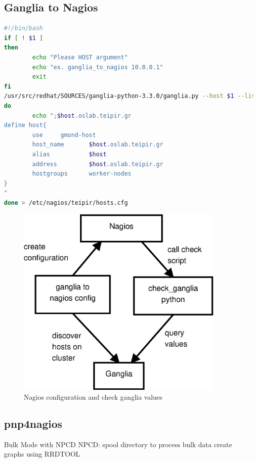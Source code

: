 \subsection{Ganglia to Nagios}

\begin{lstlisting}[language=bash,caption=Ganglia to Nagios script]
#!/bin/bash
if [ ! $1 ]
then
        echo "Please HOST argument"
        echo "ex. ganglia_to_nagios 10.0.0.1"
        exit
fi
/usr/src/redhat/SOURCES/ganglia-python-3.3.0/ganglia.py --host $1 --live | while read host
do
        echo ";$host.oslab.teipir.gr
define host{
        use     gmond-host
        host_name       $host.oslab.teipir.gr
        alias           $host
        address         $host.oslab.teipir.gr
        hostgroups      worker-nodes
}
"
done > /etc/nagios/teipir/hosts.cfg
\end{lstlisting}

\begin{figure}[htb]
\centering
 \includegraphics[width=4in]{images/nagios_check_ganglia.eps}
\caption{Nagios configuration and check ganglia values}
\label{figure:nagios_ganglia}
\end{figure}

\subsection{pnp4nagios}

Bulk Mode with NPCD
NPCD:
spool directory to process bulk data
create graphs using RRDTOOL

